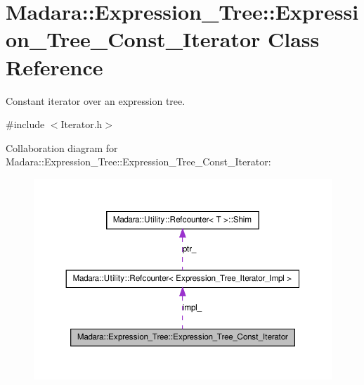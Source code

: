 \hypertarget{classMadara_1_1Expression__Tree_1_1Expression__Tree__Const__Iterator}{
\section{Madara::Expression\_\-Tree::Expression\_\-Tree\_\-Const\_\-Iterator Class Reference}
\label{db/d5c/classMadara_1_1Expression__Tree_1_1Expression__Tree__Const__Iterator}
}


Constant iterator over an expression tree.  




{\ttfamily \#include $<$Iterator.h$>$}



Collaboration diagram for Madara::Expression\_\-Tree::Expression\_\-Tree\_\-Const\_\-Iterator:
\nopagebreak
\begin{figure}[H]
\begin{center}
\leavevmode
\includegraphics[width=366pt]{de/d1b/classMadara_1_1Expression__Tree_1_1Expression__Tree__Const__Iterator__coll__graph}
\end{center}
\end{figure}
